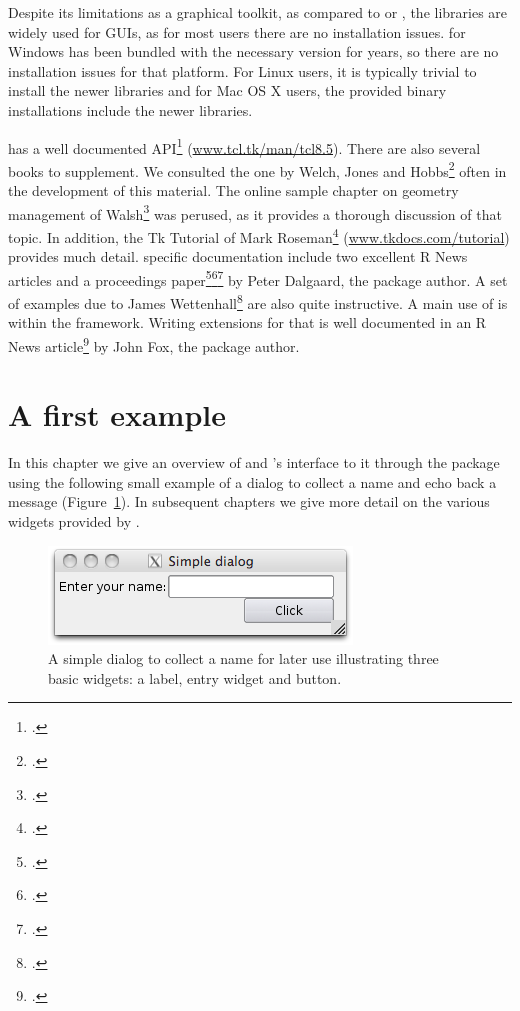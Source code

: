 Despite its limitations as a graphical toolkit, as compared to \GTK\/
or \Qt, the \TK\/ libraries are widely used for \R\/ GUIs, as for most
users there are no installation issues. \R\/ for Windows has been
bundled with the necessary \TK\/ version for years, so there are no
installation issues for that platform. For Linux users, it is
typically trivial to install the newer libraries and for Mac OS X
users, the provided binary installations include the newer \TK\/
libraries.

\Tk{} has a well documented API\footcite{TclTk:Api}
(\url{www.tcl.tk/man/tcl8.5}).  There are also several books to
supplement. We consulted the one by Welch, Jones and
Hobbs\footcite{beedub} often in the development of this
material. The online sample chapter on geometry management
of Walsh\footcite{Walsh} was perused, as it provides a thorough discussion
of that topic. In addition, the Tk Tutorial of Mark
Roseman\footcite{TclTk:Tutorial} (\url{www.tkdocs.com/tutorial})
provides much detail. \R{} specific documentation include two
excellent R News articles and a proceedings
paper\footcite{Rnews:Dalgaard:2001a}\footcite{Rnews:Dalgaard:2002}\footcite{Dalgaard-DSC}
by Peter Dalgaard, the package author. A
set of examples due to James Wettenhall\footcite{Wettenhall} are also
quite instructive. A main use of  is within the 
framework. Writing extensions for that is well documented in an R News
article\footcite{Rnews:Fox:2007} by John Fox, the package author.
 

\section{A first example}
\label{sec:first-example}

In this chapter we give an overview of \Tk\/ and \R's interface to it
through the  package using the following small example of a
dialog to collect a name and echo back a message
(Figure~\ref{fig:tcltk-simple-dialog}). In subsequent chapters we give
more detail on the various widgets provided by \Tk.

\begin{figure}
  \centering
  \includegraphics[width=.6\textwidth]{fig-tcltk-themed-dialog.png}
  \caption{A simple dialog to collect a name for later use
    illustrating three basic widgets: a label, entry widget and
    button.}
  \label{fig:tcltk-simple-dialog}
\end{figure}


